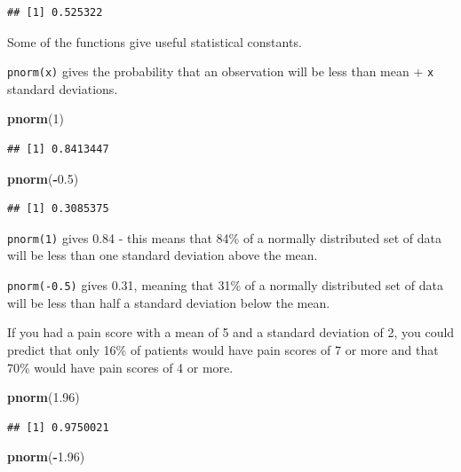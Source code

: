 \documentclass[]{book}
\newenvironment{Shaded}{\begin{snugshade}}{\end{snugshade}}
\newcommand{\DecValTok}[1]{\textcolor[rgb]{0.00,0.00,0.81}{#1}}
\newcommand{\FloatTok}[1]{\textcolor[rgb]{0.00,0.00,0.81}{#1}}
\newcommand{\KeywordTok}[1]{\textcolor[rgb]{0.13,0.29,0.53}{\textbf{#1}}}
\newcommand{\NormalTok}[1]{#1}
\newcommand{\OperatorTok}[1]{\textcolor[rgb]{0.81,0.36,0.00}{\textbf{#1}}}
\begin{document}
\begin{verbatim}
## [1] 0.525322
\end{verbatim}

Some of the functions give useful statistical constants.

\texttt{pnorm(x)} gives the probability that an observation will be less than mean + \texttt{x} standard deviations.

\begin{Shaded}
\begin{Highlighting}[]
\KeywordTok{pnorm}\NormalTok{(}\DecValTok{1}\NormalTok{)}
\end{Highlighting}
\end{Shaded}

\begin{verbatim}
## [1] 0.8413447
\end{verbatim}

\begin{Shaded}
\begin{Highlighting}[]
\KeywordTok{pnorm}\NormalTok{(}\OperatorTok{-}\FloatTok{0.5}\NormalTok{)}
\end{Highlighting}
\end{Shaded}

\begin{verbatim}
## [1] 0.3085375
\end{verbatim}

\texttt{pnorm(1)} gives 0.84 - this means that 84\% of a normally distributed set of data will be less than one standard deviation above the mean.

\texttt{pnorm(-0.5)} gives 0.31, meaning that 31\% of a normally distributed set of data will be less than half a standard deviation below the mean.

If you had a pain score with a mean of 5 and a standard deviation of 2, you could predict that only 16\% of patients would have pain scores of 7 or more and that 70\% would have pain scores of 4 or more.

\begin{Shaded}
\begin{Highlighting}[]
\KeywordTok{pnorm}\NormalTok{(}\FloatTok{1.96}\NormalTok{)}
\end{Highlighting}
\end{Shaded}

\begin{verbatim}
## [1] 0.9750021
\end{verbatim}

\begin{Shaded}
\begin{Highlighting}[]
\KeywordTok{pnorm}\NormalTok{(}\OperatorTok{-}\FloatTok{1.96}\NormalTok{)}
\end{Highlighting}
\end{Shaded}
\end{document}
